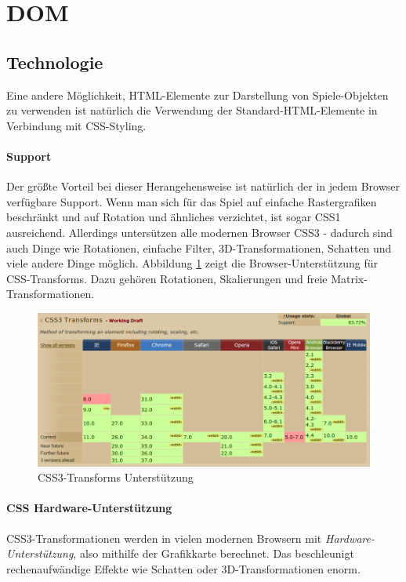 \documentclass[a4paper, 12pt]{article}
\begin{document}
\section{DOM}
\subsection{Technologie}
Eine andere Möglichkeit, HTML-Elemente zur Darstellung von Spiele-Objekten zu verwenden ist natürlich die Verwendung der Standard-HTML-Elemente in Verbindung mit CSS-Styling.
\paragraph{Support} Der größte Vorteil bei dieser Herangehensweise ist natürlich der in jedem Browser verfügbare Support. Wenn man sich für das Spiel auf einfache Rastergrafiken beschränkt und auf Rotation und ähnliches verzichtet, ist sogar CSS1 ausreichend. Allerdings untersützen alle modernen Browser CSS3 - dadurch sind auch Dinge wie Rotationen, einfache Filter, 3D-Transformationen, Schatten und viele andere Dinge möglich. Abbildung \ref{css_transforms_support} zeigt die Browser-Unterstützung für CSS-Transforms. Dazu gehören Rotationen, Skalierungen und freie Matrix-Transformationen. 
\begin{figure}[H]
	\begin{center}
		\includegraphics[width=\textwidth]{assets/css_transforms_support.png} 
	\end{center}
	\caption{CSS3-Transforms Unterstützung}
	\label{css_transforms_support}
\end{figure}
\paragraph{CSS Hardware-Unterstützung} CSS3-Transformationen werden in vielen modernen Browsern mit \emph{Hardware-Unterstützung}, also mithilfe der Grafikkarte berechnet. Das beschleunigt rechenaufwändige Effekte wie Schatten oder 3D-Transformationen enorm.
\end{document}
